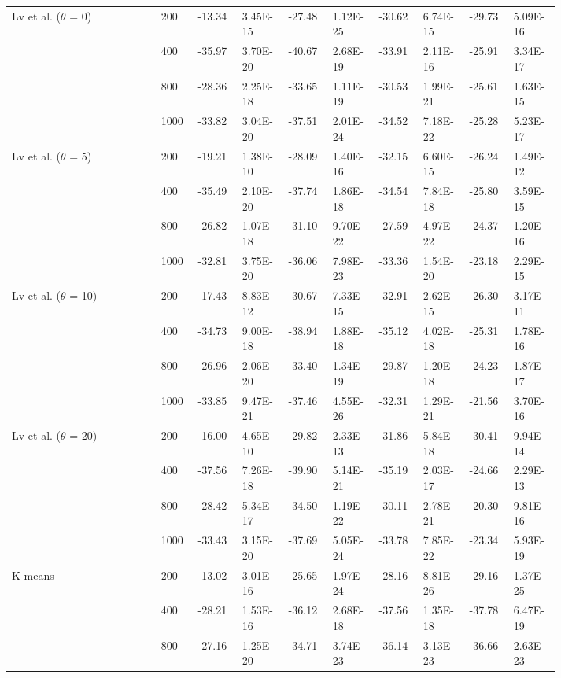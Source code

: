 \begin{landscape}
\begin{longtable}{@{}L{0.24\linewidth}C{0.05\linewidth}*{8}{R{0.065\linewidth}}@{}}
Lv et al. ($\theta$ = 0) & 200 & -13.34 & 3.45E-15 & -27.48 & 1.12E-25 & -30.62 & 6.74E-15 & -29.73 & 5.09E-16 \\
 & 400 & -35.97 & 3.70E-20 & -40.67 & 2.68E-19 & -33.91 & 2.11E-16 & -25.91 & 3.34E-17 \\
 & 800 & -28.36 & 2.25E-18 & -33.65 & 1.11E-19 & -30.53 & 1.99E-21 & -25.61 & 1.63E-15 \\
 & 1000 & -33.82 & 3.04E-20 & -37.51 & 2.01E-24 & -34.52 & 7.18E-22 & -25.28 & 5.23E-17 \\
\midrule
Lv et al. ($\theta$ = 5) & 200 & -19.21 & 1.38E-10 & -28.09 & 1.40E-16 & -32.15 & 6.60E-15 & -26.24 & 1.49E-12 \\
 & 400 & -35.49 & 2.10E-20 & -37.74 & 1.86E-18 & -34.54 & 7.84E-18 & -25.80 & 3.59E-15 \\
 & 800 & -26.82 & 1.07E-18 & -31.10 & 9.70E-22 & -27.59 & 4.97E-22 & -24.37 & 1.20E-16 \\
 & 1000 & -32.81 & 3.75E-20 & -36.06 & 7.98E-23 & -33.36 & 1.54E-20 & -23.18 & 2.29E-15 \\
\midrule
Lv et al. ($\theta$ = 10) & 200 & -17.43 & 8.83E-12 & -30.67 & 7.33E-15 & -32.91 & 2.62E-15 & -26.30 & 3.17E-11 \\
 & 400 & -34.73 & 9.00E-18 & -38.94 & 1.88E-18 & -35.12 & 4.02E-18 & -25.31 & 1.78E-16 \\
 & 800 & -26.96 & 2.06E-20 & -33.40 & 1.34E-19 & -29.87 & 1.20E-18 & -24.23 & 1.87E-17 \\
 & 1000 & -33.85 & 9.47E-21 & -37.46 & 4.55E-26 & -32.31 & 1.29E-21 & -21.56 & 3.70E-16 \\
\midrule
Lv et al. ($\theta$ = 20) & 200 & -16.00 & 4.65E-10 & -29.82 & 2.33E-13 & -31.86 & 5.84E-18 & -30.41 & 9.94E-14 \\
 & 400 & -37.56 & 7.26E-18 & -39.90 & 5.14E-21 & -35.19 & 2.03E-17 & -24.66 & 2.29E-13 \\
 & 800 & -28.42 & 5.34E-17 & -34.50 & 1.19E-22 & -30.11 & 2.78E-21 & -20.30 & 9.81E-16 \\
 & 1000 & -33.43 & 3.15E-20 & -37.69 & 5.05E-24 & -33.78 & 7.85E-22 & -23.34 & 5.93E-19 \\
\midrule
K-means & 200 & -13.02 & 3.01E-16 & -25.65 & 1.97E-24 & -28.16 & 8.81E-26 & -29.16 & 1.37E-25 \\
 & 400 & -28.21 & 1.53E-16 & -36.12 & 2.68E-18 & -37.56 & 1.35E-18 & -37.78 & 6.47E-19 \\
 & 800 & -27.16 & 1.25E-20 & -34.71 & 3.74E-23 & -36.14 & 3.13E-23 & -36.66 & 2.63E-23 \\

\end{longtable}
\end{landscape}
